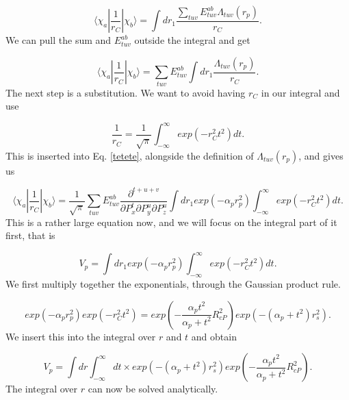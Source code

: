 \documentclass[a4paper,norsk,11pt,twoside]{report}
\begin{document}
\begin{equation}
\langle \chi_a | \frac{1}{r_C} | \chi_b \rangle = \int dr_1 \frac{\sum_{tuv} E_{tuv}^{ab} \Lambda_{tuv}(r_p)}{r_C}  .
\end{equation}
We can pull the sum and $E_{tuv}^{ab}$ outside the integral and get

\begin{equation}
\langle \chi_a | \frac{1}{r_C} | \chi_b \rangle = \sum_{tuv} E_{tuv}^{ab} \int dr_1 \frac{\Lambda_{tuv}(r_p)}{r_C}  .
\label{tetete}
\end{equation}
The next step is a substitution. We want to avoid having $r_C$ in our integral and use

\begin{equation}
\frac{1}{r_C} = \frac{1}{\sqrt{\pi}} \int_{-\infty}^{\infty} exp \left( -r_C^2 t^2 \right) dt .
\end{equation}
This is inserted into Eq. \eqref{tetete}, alongside the definition of $\Lambda_{tuv}(r_p)$, and gives us

\begin{equation}
\langle \chi_a | \frac{1}{r_C} | \chi_b \rangle = \frac{1}{\sqrt{\pi}} \sum_{tuv} E_{tuv}^{ab} \frac{\partial^{t+u+v}}{\partial P_x^t \partial P_y^u \partial P_z^u} \int dr_1 exp(-\alpha_p r_p^2)
 \int_{-\infty}^{\infty} exp \left( -r_C^2 t^2 \right) dt .
 \label{insert_boys2}
\end{equation}
This is a rather large equation now, and we will focus on the integral part of it first, that is

\begin{equation}
V_p = \int dr_1 exp(-\alpha_p r_p^2)
 \int_{-\infty}^{\infty} exp \left( -r_C^2 t^2 \right) dt . 
\end{equation}
We first multiply together the exponentials, through the Gaussian product rule.

\begin{equation}
exp(-\alpha_p r_p^2) exp \left( -r_C^2 t^2 \right) 
= exp \left( - \frac{\alpha_p t^2}{\alpha_p + t^2} R_{cP}^2 \right)
exp \left(
- (\alpha_p + t^2) r_s^2
\right) .
\end{equation}
We insert this into the integral over $r$ and $t$ and obtain

\begin{equation}
V_p = 
\int dr \int_{-\infty}^{\infty}  dt \times
exp \left(
- (\alpha_p + t^2) r_s^2
\right)
 exp \left( - \frac{\alpha_p t^2}{\alpha_p + t^2} R_{cP}^2 \right) .
\end{equation}
The integral over $r$ can now be solved analytically.
\end{document}
